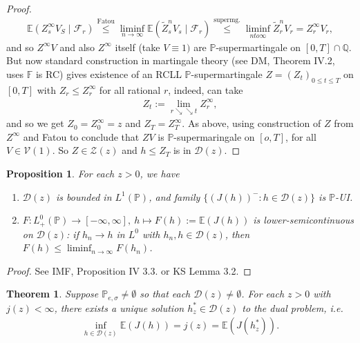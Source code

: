 \documentclass[12pt,a4paper, twoside]{article}
\newtheorem{thm}{Theorem}[section]
\newtheorem{prop}{Proposition}[section]
\theoremstyle{definition}
\newcommand{\EE}{\mathbb{E}} %
\newcommand{\PP}{\mathbb{P}} %
\begin{document}
\begin{proof}
\begin{align*}
\EE(Z_s^\infty V_S \mid \mathcal{F}_r) \overset{\text{Fatou}}\leq \liminf_{n \to \infty} \EE( \widetilde{Z}_s^n V_s \mid \mathcal{F}_r) \overset{\text{supermg.}}\leq \liminf_{n to \infty} \widetilde{Z}_r^n V_r = Z_r^\infty V_r,
\end{align*}
and so $Z^\infty V$ and also $Z^\infty$ itself (take $V \equiv 1)$ are $\PP$-supermartingale on $[0,T] \cap \mathbb{Q}$. But now standard construction in martingale theory (see DM, Theorem IV.2, uses $\mathbb{F}$ is RC) gives existence of an RCLL $\PP$-supermartingale $Z=(Z_t)_{0 \leq t \leq T}$ on $[0,T]$ with $Z_r \leq Z_r^\infty$ for all rational $r$, indeed, can take 
\begin{align*}
Z_t:= \lim_{r \searrow \searrow t} Z_r^\infty,
\end{align*}
and so we get $Z_0 = Z_0^\infty = z$ and $Z_T= Z_T^\infty$. As above, using construction of $Z$ from $Z^\infty$ and Fatou to conclude that $ZV$ is $\PP$-supermaringale on $[o,T]$, for all $V \in \mathcal{V}(1)$. So $Z \in \mathcal{Z}(z)$ and $h \leq Z_T$ is in $\mathcal{D}(z)$. 
\end{proof}
\begin{prop} \label{P113} For each $z >0$, we have 
\begin{enumerate}
\item $\mathcal{D}(z)$ is bounded in $L^1(\PP)$, and family $\{(J(h))^- : h \in \mathcal{D}(z)\}$ is $\PP$-UI. 
\item $F: L_+^0( \PP) \to [- \infty, \infty], \ h \mapsto F(h):= \EE(J(h))$ is lower-semicontinuous on $\mathcal{D}(z)$: if $h_n \to h$ in $L^0$ with $h_n, h \in \mathcal{D}(z)$, then $F(h) \leq \liminf_{n \to \infty} F(h_n)$. 
\end{enumerate}
\end{prop}
\begin{proof}
See IMF, Proposition IV 3.3. or KS Lemma 3.2.
\end{proof}
\newpage
\begin{thm} \label{T114} Suppose $\PP_{e, \sigma} \neq \emptyset$ so that each $\mathcal{D}(z) \neq \emptyset$. For each $z>0$ with $j(z) < \infty$, there exists a unique solution $h_z^* \in \mathcal{D}(z)$ to the dual problem, i.e. 
\begin{align*}
\inf_{h \in \mathcal{D}(z)} \EE(J(h)) = j(z) = \EE(J(h_z^*)). 
\end{align*}
\end{thm}
\end{document}
